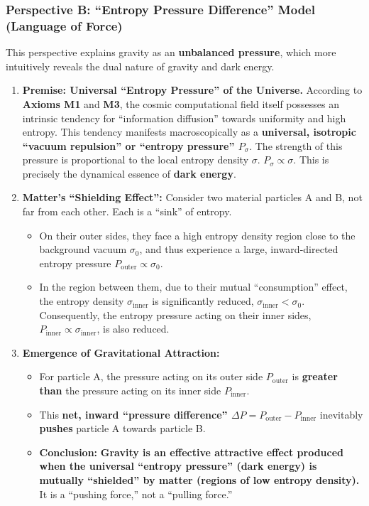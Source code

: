 \documentclass[11pt, a4paper]{article}
\begin{document}
\subsubsection*{Perspective B: ``Entropy Pressure Difference'' Model (Language of Force)}

This perspective explains gravity as an \textbf{unbalanced pressure}, which more intuitively reveals the dual nature of gravity and dark energy.

\begin{enumerate}
    \item \textbf{Premise: Universal ``Entropy Pressure'' of the Universe.} According to \textbf{Axioms M1} and \textbf{M3}, the cosmic computational field itself possesses an intrinsic tendency for ``information diffusion'' towards uniformity and high entropy. This tendency manifests macroscopically as a \textbf{universal, isotropic ``vacuum repulsion'' or ``entropy pressure'' $P_\sigma$}. The strength of this pressure is proportional to the local entropy density $\sigma$. $P_\sigma \propto \sigma$. This is precisely the dynamical essence of \textbf{dark energy}.

    \item \textbf{Matter's ``Shielding Effect'':} Consider two material particles A and B, not far from each other. Each is a ``sink'' of entropy.
    \begin{itemize}
        \item On their outer sides, they face a high entropy density region close to the background vacuum $\sigma_0$, and thus experience a large, inward-directed entropy pressure $P_{\text{outer}} \propto \sigma_0$.
        \item In the region between them, due to their mutual ``consumption'' effect, the entropy density $\sigma_{\text{inner}}$ is significantly reduced, $\sigma_{\text{inner}} < \sigma_0$. Consequently, the entropy pressure acting on their inner sides, $P_{\text{inner}} \propto \sigma_{\text{inner}}$, is also reduced.
    \end{itemize}

    \item \textbf{Emergence of Gravitational Attraction:}
    \begin{itemize}
        \item For particle A, the pressure acting on its outer side $P_{\text{outer}}$ is \textbf{greater than} the pressure acting on its inner side $P_{\text{inner}}$.
        \item This \textbf{net, inward ``pressure difference'' $\Delta P = P_{\text{outer}} - P_{\text{inner}}$} inevitably \textbf{pushes} particle A towards particle B.
        \item \textbf{Conclusion:} \textbf{Gravity is an effective attractive effect produced when the universal ``entropy pressure'' (dark energy) is mutually ``shielded'' by matter (regions of low entropy density).} It is a ``pushing force,'' not a ``pulling force.''
    \end{itemize}
\end{enumerate}
\end{document}
